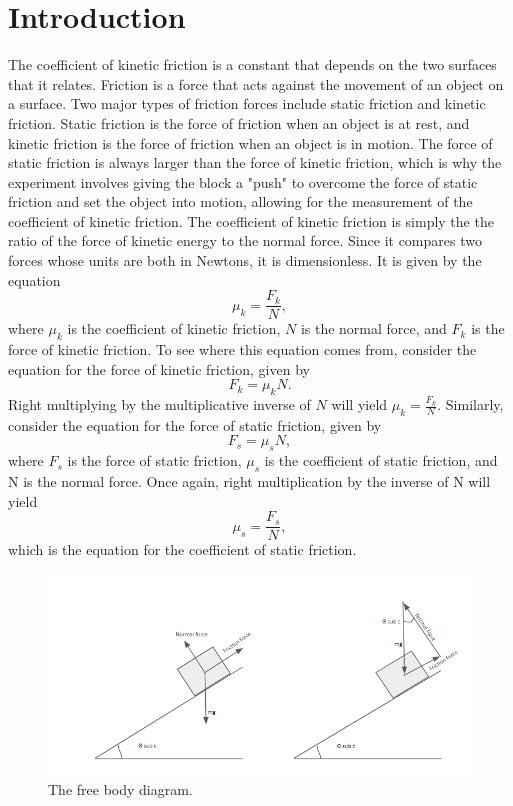 \documentclass{article}
\theoremstyle{definition}
\begin{document}
\section{Introduction}
The coefficient of kinetic friction is a constant that depends on the two
surfaces that it relates. Friction is a force that acts against the movement
of an object on a surface. Two major types of friction forces include static friction
and kinetic friction. Static friction is the force of friction when an object
is at rest, and kinetic friction is the force of friction when an object is in
motion. The force of static friction is always larger than the force of 
kinetic friction, which is why the experiment involves giving the block a "push"
to overcome the force of static friction and set the object into motion, allowing
for the measurement of the coefficient of kinetic friction. The coefficient of 
kinetic friction is simply the the ratio of the force of kinetic energy to the 
normal force. Since it compares two forces whose units are both in Newtons, it is dimensionless. It is given by 
the equation
\begin{equation} \label{eq:1}
    \mu_k = \frac{F_k}{N},
\end{equation}
where $\mu_k$ is the coefficient of kinetic friction, $N$ is the normal force, 
and $F_k$ is the force of kinetic friction. To see where this equation comes from,
consider the equation for the force of kinetic friction, given by
\begin{equation} \label{eq:2}
    F_k=\mu_k N.
\end{equation}
Right multiplying by the multiplicative inverse of $N$ will yield $\mu_k = \frac{F_k}{N}$.
Similarly, consider the equation for the force of static friction, given by
\begin{equation} \label{eq:3}
    F_s=\mu_s N,
\end{equation}
where $F_s$ is the force of static friction, $\mu_s$ is the coefficient of static friction,
and N is the normal force.
Once again, right multiplication by the inverse of N will yield
\begin{equation} \label{eq:4}
    \mu_s = \frac{F_s}{N},
\end{equation}
which is the equation for the coefficient of static friction. 
\begin{figure}
    \includegraphics[width = 1 \columnwidth]{fig1.PNG}
    \caption{The free body diagram.}
    \label{fig:1}
\end{figure}
\end{document}
